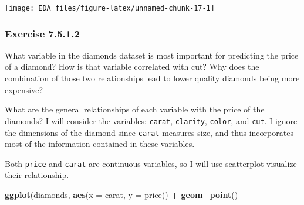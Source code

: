 \documentclass[]{book}
\newenvironment{Shaded}{\begin{snugshade}}{\end{snugshade}}
\newcommand{\DataTypeTok}[1]{\textcolor[rgb]{0.13,0.29,0.53}{#1}}
\newcommand{\DecValTok}[1]{\textcolor[rgb]{0.00,0.00,0.81}{#1}}
\newcommand{\KeywordTok}[1]{\textcolor[rgb]{0.13,0.29,0.53}{\textbf{#1}}}
\newcommand{\NormalTok}[1]{#1}
\newcommand{\OperatorTok}[1]{\textcolor[rgb]{0.81,0.36,0.00}{\textbf{#1}}}
\newcommand{\StringTok}[1]{\textcolor[rgb]{0.31,0.60,0.02}{#1}}
\theoremstyle{plain}
\theoremstyle{remark}
\theoremstyle{definition}
\theoremstyle{definition}
\theoremstyle{definition}
\theoremstyle{remark}
\begin{document}
\begin{Shaded}
\end{Shaded}

\begin{center}\texttt{[image: EDA\_files/figure-latex/unnamed-chunk-17-1]} \end{center}

\hypertarget{exercise-7.5.1.2}{%
\subsubsection*{\texorpdfstring{Exercise
{7.5.1.2}}{Exercise 7.5.1.2}}\label{exercise-7.5.1.2}}

What variable in the diamonds dataset is most important for predicting
the price of a diamond? How is that variable correlated with cut? Why
does the combination of those two relationships lead to lower quality
diamonds being more expensive?

What are the general relationships of each variable with the price of
the diamonds? I will consider the variables: \texttt{carat},
\texttt{clarity}, \texttt{color}, and \texttt{cut}. I ignore the
dimensions of the diamond since \texttt{carat} measures size, and thus
incorporates most of the information contained in these variables.

Both \texttt{price} and \texttt{carat} are continuous variables, so I
will use scatterplot visualize their relationship.

\begin{Shaded}
\begin{Highlighting}[]
\KeywordTok{ggplot}\NormalTok{(diamonds, }\KeywordTok{aes}\NormalTok{(}\DataTypeTok{x =}\NormalTok{ carat, }\DataTypeTok{y =}\NormalTok{ price)) }\OperatorTok{+}
\StringTok{  }\KeywordTok{geom_point}\NormalTok{()}
\end{Highlighting}
\end{Shaded}
\end{document}
